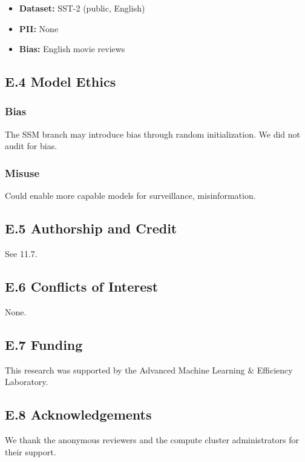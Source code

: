 \begin{itemize}
\item \textbf{Dataset:} SST-2 (public, English)
\item \textbf{PII:} None
\item \textbf{Bias:} English movie reviews

\end{itemize}
\subsection{E.4 Model Ethics}

\subsubsection{Bias}

The SSM branch may introduce bias through random initialization. We did 
not audit for bias.

\subsubsection{Misuse}

Could enable more capable models for surveillance, misinformation.

\subsection{E.5 Authorship and Credit}

See  11.7.

\subsection{E.6 Conflicts of Interest}

None.

\subsection{E.7 Funding}

This research was supported by the Advanced Machine Learning & Efficiency Laboratory.

\subsection{E.8 Acknowledgements}

We thank the anonymous reviewers and the compute cluster administrators for their support.


